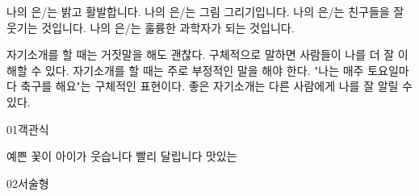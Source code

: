 \documentclass[fs13,seriesSau]{korfarm-base}
\begin{document}


\kfActivityBg \par{}\par\nopagebreak[4]\smallskip\nopagebreak[4]
\begin{kfBlankList}
\kfBlankItem 나의 \kfFillBlank[12mm]{}은/는 밝고 활발합니다.
\kfBlankItem 나의 \kfFillBlank[12mm]{}은/는 그림 그리기입니다.
\kfBlankItem 나의 \kfFillBlank[12mm]{}은/는 친구들을 잘 웃기는 것입니다.
\kfBlankItem 나의 \kfFillBlank[12mm]{}은/는 훌륭한 과학자가 되는 것입니다.
\end{kfBlankList}

\kfActivityBg \par{}\par\nopagebreak[4]\smallskip\nopagebreak[4]
\begin{kfOXList}
\kfOXItem 자기소개를 할 때는 거짓말을 해도 괜찮다. \kfFillBlank[12mm]{} \kfOX
\kfOXItem 구체적으로 말하면 사람들이 나를 더 잘 이해할 수 있다. \kfFillBlank[12mm]{} \kfOX
\kfOXItem 자기소개를 할 때는 주로 부정적인 말을 해야 한다. \kfFillBlank[12mm]{} \kfOX
\kfOXItem "나는 매주 토요일마다 축구를 해요"는 구체적인 표현이다. \kfFillBlank[12mm]{} \kfOX
\kfOXItem 좋은 자기소개는 다른 사람에게 나를 잘 알릴 수 있다. \kfFillBlank[12mm]{} \kfOX
\end{kfOXList}


\begin{kfQBlock}{01}{객관식}
\begin{kfChoices}
\kfChoice 예쁜 꽃이
\kfChoice 아이가 웃습니다
\kfChoice 빨리 달립니다
\kfChoice 맛있는
\end{kfChoices}
\end{kfQBlock}
\begin{kfQBlock}{02}{서술형}
\end{kfQBlock}
\end{document}
